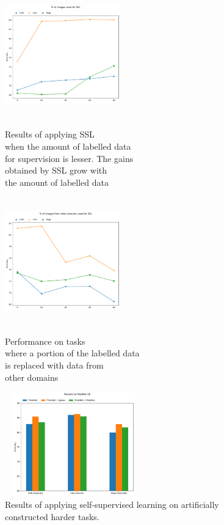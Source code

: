 \begin{figure}[t]
    \begin{minipage}{0.33\textwidth}
        \vspace{0.2cm}
        \includegraphics[width=5cm, height=5.5cm]{pdfs/ssl.pdf} %
        \caption{Results of applying SSL \\ when the amount of labelled data \\ for supervision is lesser. The gains \\ obtained by SSL grow with \\ the amount of labelled data}
        \label{fig:20-40-60-80}
    \end{minipage}\hfill
    \begin{minipage}{0.33\textwidth}
        \includegraphics[width=5cm, height=5.5cm]{pdfs/ssl_other_domains.pdf} %
        \caption{Performance on tasks \\ where a portion of the labelled data \\ is replaced with data from \\ other domains}
        \label{fig:20-60-other}
    \end{minipage}\hfill
    \begin{minipage}{0.33\textwidth}
        \includegraphics[width=6cm, height=4.5cm]{pdfs/grey_low_res.pdf} %
        \caption{Results of applying self-supervised learning on artificially constructed harder tasks.}
        \label{fig:lowres}
    \end{minipage}\hfill
\end{figure}

